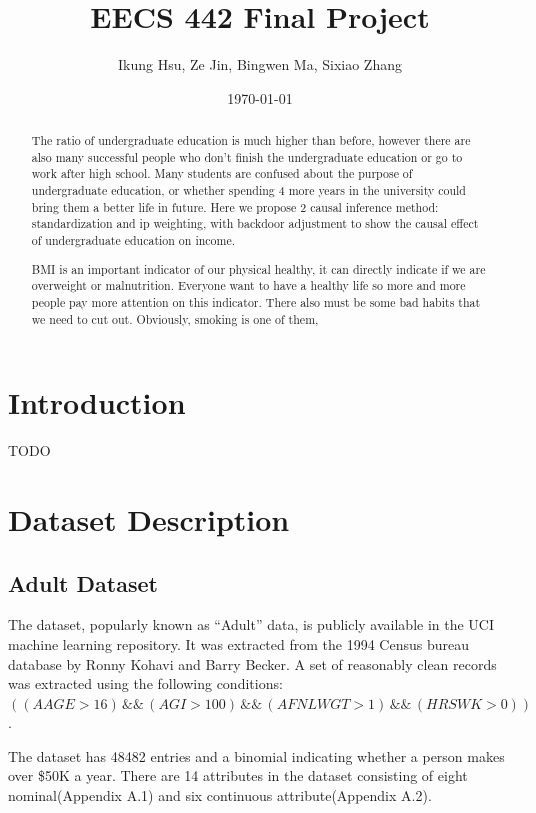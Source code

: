 \documentclass[letterpaper,12pt]{article}
\begin{document}
\title{EECS 442 Final Project}
\author{Ikung Hsu, Ze Jin, Bingwen Ma, Sixiao Zhang}
\date{\today}
\maketitle

\begin{abstract}
\noindent The ratio of undergraduate education is much higher than before, however there are also many successful people who don’t finish the undergraduate education or go to work after high school. Many students are confused about the purpose of undergraduate education, or whether spending 4 more years in the university could bring them a better life in future. Here we propose 2 causal inference method: standardization and ip weighting, with backdoor adjustment to show the causal effect of undergraduate education on income.

BMI is an important indicator of our physical healthy, it can directly indicate if we are overweight or malnutrition. Everyone want to have a healthy life so more and more people pay more attention on this indicator. There also must be some bad habits that we need to cut out. Obviously, smoking is one of them, 
\end{abstract}


\section{Introduction}
TODO

\section{Dataset Description}
\subsection{Adult Dataset}

The dataset, popularly known as “Adult” data, is publicly available in the UCI machine learning repository. It was extracted from the 1994  Census bureau database by Ronny Kohavi and Barry Becker.  A set of reasonably clean records was extracted using the following conditions: $((AAGE>16) \,\&\&\,  (AGI>100) \,\&\&\,  (AFNLWGT>1)\,\&\&\, (HRSWK>0))$. \par
\noindent The dataset has 48482 entries and a binomial indicating whether a person makes over \$50K a year. There are  14 attributes in the dataset consisting of eight nominal(Appendix A.1) and six continuous attribute(Appendix A.2).\par
\end{document}
